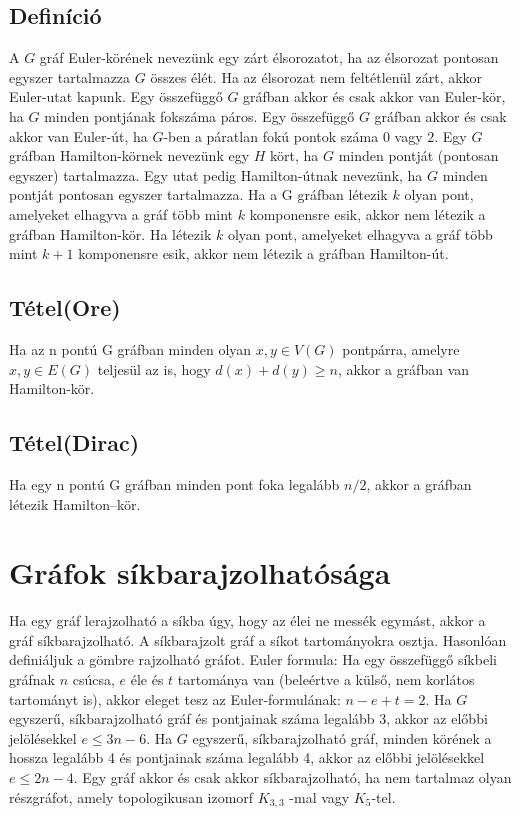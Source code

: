 \documentclass[12pt,a4paper,twoside]{report}
\begin{document}
\subsection{Definíció}
A $G$ gráf Euler-körének nevezünk egy zárt élsorozatot, ha az élsorozat pontosan egyszer tartalmazza $G$ összes élét. Ha az élsorozat nem feltétlenül zárt, akkor Euler-utat kapunk.
\ttl
Egy összefüggő $G$ gráfban akkor és csak akkor van Euler-kör, ha $G$ minden pontjának fokszáma páros.
\ttl
 Egy összefüggő $G$ gráfban akkor és csak akkor van Euler-út, ha $G$-ben a páratlan fokú pontok száma $0$ vagy $2$.
\df
Egy $G$ gráfban Hamilton-körnek nevezünk egy $H$ kört, ha $G$ minden pontját (pontosan egyszer) tartalmazza. Egy utat pedig Hamilton-útnak nevezünk, ha $G$ minden pontját pontosan egyszer tartalmazza.
\ttl
Ha a G gráfban létezik $k$ olyan pont, amelyeket elhagyva a gráf több mint $k$ komponensre esik, akkor nem létezik a gráfban Hamilton-kör. Ha létezik $k$ olyan pont, amelyeket elhagyva a gráf több mint $k + 1$ komponensre esik, akkor nem létezik a gráfban Hamilton-út.
\subsection{Tétel(Ore)}
Ha az n pontú G gráfban minden olyan $x, y \in V (G)$ pontpárra, amelyre ${x, y} \in E(G)$ teljesül az is, hogy $d(x) + d(y) \geq n$, akkor a gráfban van Hamilton-kör.
\subsection{Tétel(Dirac)}
Ha egy n pontú G gráfban minden pont foka legalább $n/2$, akkor a gráfban létezik Hamilton–kör.
\section{Gráfok síkbarajzolhatósága}
\df
Ha egy gráf lerajzolható a síkba úgy, hogy az élei ne messék egymást, akkor a gráf síkbarajzolható. A síkbarajzolt gráf a síkot tartományokra osztja. Hasonlóan definiáljuk a gömbre rajzolható gráfot.
\ttl
Euler formula: Ha egy összefüggő síkbeli gráfnak $n$ csúcsa, $e$ éle és $t$ tartománya van (beleértve a külső, nem korlátos tartományt is), akkor eleget tesz az Euler-formulának: $n-e+t = 2$.
\ttl
Ha $G$ egyszerű, síkbarajzolható gráf és pontjainak száma legalább 3, akkor az előbbi jelölésekkel $e\leq3n-6$.
\ttl
Ha $G$ egyszerű, síkbarajzolható gráf, minden körének a hossza legalább 4 és pontjainak száma legalább 4, akkor az előbbi jelölésekkel $e\leq2n-4$.
\ttl
Egy gráf akkor és csak akkor síkbarajzolható, ha nem tartalmaz olyan részgráfot, amely topologikusan izomorf $K_{3,3}$ -mal vagy $K_5$-tel.
\end{document}
